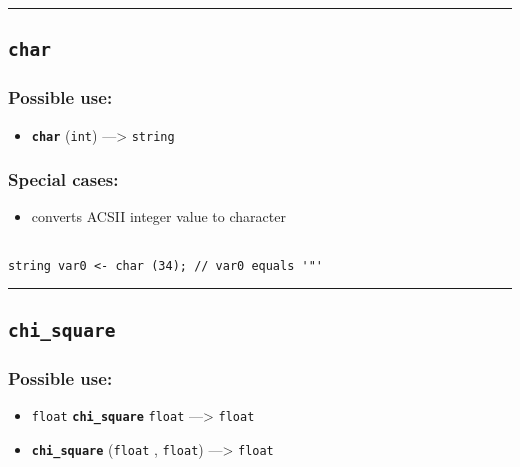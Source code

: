 \documentclass[]{book}
\providecommand{\tightlist}{%
  \setlength{\itemsep}{0pt}\setlength{\parskip}{0pt}}
\theoremstyle{definition}
\theoremstyle{definition}
\theoremstyle{definition}
\theoremstyle{remark}
\begin{document}
\begin{center}\rule{0.5\linewidth}{\linethickness}\end{center}

\subsection{\texorpdfstring{\texttt{char}}{char}}\label{char}

\subsubsection{Possible use:}\label{possible-use-82}

\begin{itemize}
\tightlist
\item
  \textbf{\texttt{char}} (\texttt{int}) ---\textgreater{}
  \texttt{string}
\end{itemize}

\subsubsection{Special cases:}\label{special-cases-27}

\begin{itemize}
\tightlist
\item
  converts ACSII integer value to character
\end{itemize}

\begin{verbatim}
 
string var0 <- char (34); // var0 equals '"'
\end{verbatim}

\begin{center}\rule{0.5\linewidth}{\linethickness}\end{center}

\subsection{\texorpdfstring{\texttt{chi\_square}}{chi\_square}}\label{chi_square}

\subsubsection{Possible use:}\label{possible-use-83}

\begin{itemize}
\tightlist
\item
  \texttt{float} \textbf{\texttt{chi\_square}} \texttt{float}
  ---\textgreater{} \texttt{float}
\item
  \textbf{\texttt{chi\_square}} (\texttt{float} , \texttt{float})
  ---\textgreater{} \texttt{float}
\end{itemize}
\end{document}
